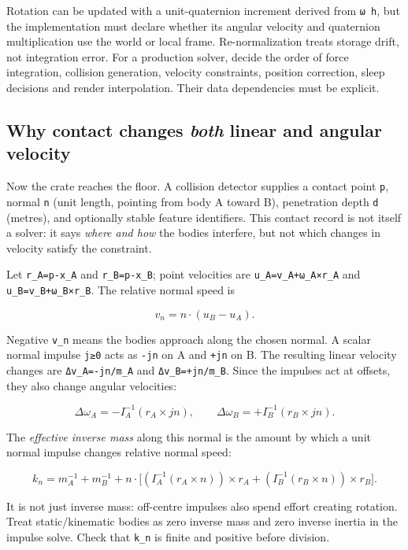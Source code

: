 Rotation can be updated with a unit-quaternion increment derived from \texttt{ω\ h}, but the implementation must declare whether its angular velocity and quaternion multiplication use the world or local frame. Re-normalization treats storage drift, not integration error. For a production solver, decide the order of force integration, collision generation, velocity constraints, position correction, sleep decisions and render interpolation. Their data dependencies must be explicit.

\subsection{\texorpdfstring{Why contact changes \emph{both} linear and angular velocity}{Why contact changes both linear and angular velocity}}\label{02-foundations-ii-ch039-why-contact-changes-both-linear-and-angular-velocity}

Now the crate reaches the floor. A collision detector supplies a contact point \texttt{p}, normal \texttt{n} (unit length, pointing from body A toward B), penetration depth \texttt{d} (metres), and optionally stable feature identifiers. This contact record is not itself a solver: it says \emph{where and how} the bodies interfere, but not which changes in velocity satisfy the constraint.

Let \texttt{r\_A=p-x\_A} and \texttt{r\_B=p-x\_B}; point velocities are \texttt{u\_A=v\_A+ω\_A×r\_A} and \texttt{u\_B=v\_B+ω\_B×r\_B}. The relative normal speed is

\[
v_n=n\cdot(u_B-u_A).
\]

Negative \texttt{v\_n} means the bodies approach along the chosen normal. A scalar normal impulse \texttt{j≥0} acts as \texttt{-jn} on A and \texttt{+jn} on B. The resulting linear velocity changes are \texttt{Δv\_A=-jn/m\_A} and \texttt{Δv\_B=+jn/m\_B}. Since the impulses act at offsets, they also change angular velocities:

\[
\Delta\omega_A=-I_A^{-1}(r_A\times jn),\qquad
\Delta\omega_B=+I_B^{-1}(r_B\times jn).
\]

The \emph{effective inverse mass} along this normal is the amount by which a unit normal impulse changes relative normal speed:

\[
k_n=m_A^{-1}+m_B^{-1}
+n\cdot\Big[
(I_A^{-1}(r_A\times n))\times r_A
+(I_B^{-1}(r_B\times n))\times r_B
\Big].
\]

It is not just inverse mass: off-centre impulses also spend effort creating rotation. Treat static/kinematic bodies as zero inverse mass and zero inverse inertia in the impulse solve. Check that \texttt{k\_n} is finite and positive before division.

